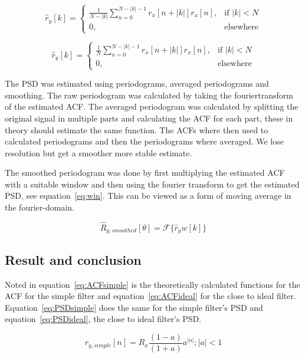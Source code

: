 \documentclass[10pt]{article}
\begin{document}
\begin{equation}
\label{eq:BmanT}
\hat{r}_y[k] =
\begin{cases}
    \frac{1}{N-|k|}\sum_{n=0}^{N-|k|-1}r_x[n+|k|]r_x[n],& \text{if } |k|< N\\
    0,              & \text{elsewhere}
\end{cases}
\end{equation}


\begin{equation}
\label{eq:Blett}
\hat{r}_y[k] =
\begin{cases}
    \frac{1}{N}\sum_{n=0}^{N-|k|-1}r_x[n+|k|]r_x[n],& \text{if } |k|< N\\
    0,              & \text{elsewhere}
\end{cases}
\end{equation}

The PSD was estimated using periodograms, averaged periodograms
and smoothing. The raw periodogram was calculated by taking the fouriertransform
of the estimated ACF.
The averaged periodogram was calculated by splitting the original signal in multiple
parts and calculating the ACF for each part, these in theory should estimate the same
function. The ACFs where then used to calculated periodograms and then the periodograms
where averaged. We lose resolution but get a smoother more stable estimate.

The smoothed periodogram was done by first multiplying the estimated ACF with a
 suitable window and then using the fourier transform to get the estimated PSD,
 see equation~\ref{eq:win}. This can be viewed as a form of moving average in the fourier-domain.

 \begin{equation}
 \label{eq:win}
 \hat{R}_{y,smoothed}[\theta] = \mathcal{F}\{\hat{r}_yw[k]\}
 \end{equation}



\subsection{Result and conclusion}

Noted in equation~\ref{eq:ACFsimple} is the theoretically calculated functions
for the ACF for the simple filter and equation~\ref{eq:ACFideal} for the close
to ideal filter.
Equation~\ref{eq:PSDsimple} does the same for the simple filter's PSD
and equation~\ref{eq:PSDideal}, the close to ideal filter's PSD.

\begin{equation}
  \label{eq:ACFsimple}
  r_{y,simple}[n] = R_x\frac{(1-a)}{(1+a)}a^{|n|};  |a| < 1
\end{equation}
\end{document}
